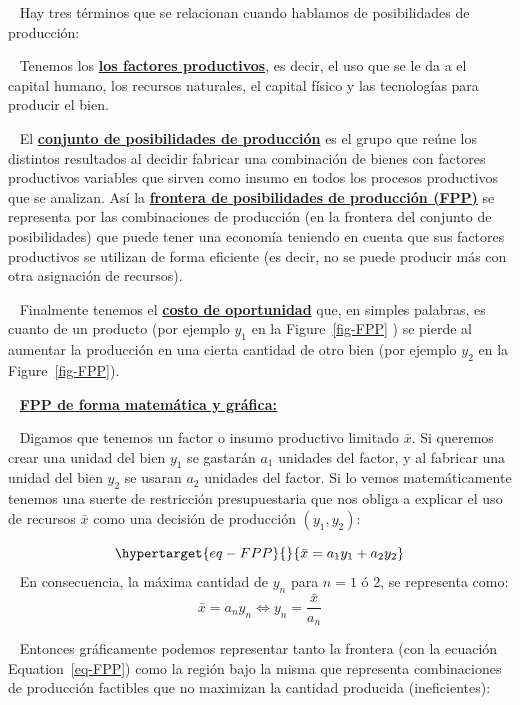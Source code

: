 \documentclass[
  letterpaper,
  DIV=11,
  numbers=noendperiod]{scrreport}
\begin{document}
~ Hay tres términos que se relacionan cuando hablamos de posibilidades
de producción:

~ Tenemos los \ul{\textbf{los factores productivos}}, es decir, el uso
que se le da a el capital humano, los recursos naturales, el capital
físico y las tecnologías para producir el bien.

~ El \ul{\textbf{conjunto de posibilidades de producción}} es el grupo
que reúne los distintos resultados al decidir fabricar una combinación
de bienes con factores productivos variables que sirven como insumo en
todos los procesos productivos que se analizan. Así la
\ul{\textbf{frontera de posibilidades de producción (FPP)}} se
representa por las combinaciones de producción (en la frontera del
conjunto de posibilidades) que puede tener una economía teniendo en
cuenta que sus factores productivos se utilizan de forma eficiente (es
decir, no se puede producir más con otra asignación de recursos).

~ Finalmente tenemos el \ul{\textbf{costo de oportunidad}} que, en
simples palabras, es cuanto de un producto (por ejemplo \(y_1\) en la
Figure~\ref{fig-FPP} ) se pierde al aumentar la producción en una cierta
cantidad de otro bien (por ejemplo \(y_2\) en la Figure~\ref{fig-FPP}).

~ \ul{\textbf{FPP de forma matemática y gráfica:}}

~ Digamos que tenemos un factor o insumo productivo limitado \(\bar x\).
Si queremos crear una unidad del bien \(y_1\) se gastarán \(a_1\)
unidades del factor, y al fabricar una unidad del bien \(y_2\) se usaran
\(a_2\) unidades del factor. Si lo vemos matemáticamente tenemos una
suerte de restricción presupuestaria que nos obliga a explicar el uso de
recursos \(\bar x\) como una decisión de producción \((y_1,y_2)\):

\begin{equation}\protect\hypertarget{eq-FPP}{}{
\bar x=a_1y_1+a_2y_2
}\label{eq-FPP}\end{equation} ~ En consecuencia, la máxima cantidad de
\(y_n\) para \(n = 1\) ó \(2\), se representa como: \[
\bar x=a_ny_n \Leftrightarrow y_n=\frac{\bar x}{a_n}
\]

~ Entonces gráficamente podemos representar tanto la frontera (con la
ecuación Equation~\ref{eq-FPP}) como la región bajo la misma que
representa combinaciones de producción factibles que no maximizan la
cantidad producida (ineficientes):
\end{document}
